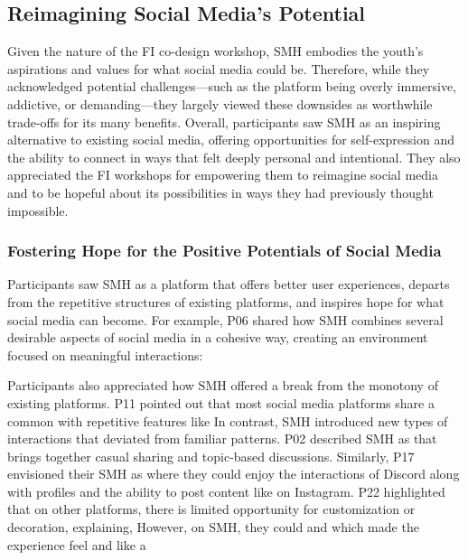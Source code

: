 \subsection{Reimagining Social Media's Potential}
\label{lab:4-6}
Given the nature of the FI co-design workshop, SMH embodies the youth's aspirations and values for what social media could be. Therefore, while they acknowledged potential challenges---such as the platform being overly immersive, addictive, or demanding---they largely viewed these downsides as worthwhile trade-offs for its many benefits. Overall, participants saw SMH as an inspiring alternative to existing social media, offering opportunities for self-expression and the ability to connect in ways that felt deeply personal and intentional. They also appreciated the FI workshops for empowering them to reimagine social media and to be hopeful about its possibilities in ways they had previously thought impossible.

\subsubsection{Fostering Hope for the Positive Potentials of Social Media}
\label{lab:4-6-1}
Participants saw SMH as a platform that offers better user experiences, departs from the repetitive structures of existing platforms, and inspires hope for what social media can become. For example, P06 shared how SMH combines several desirable aspects of social media in a cohesive way, creating an environment focused on meaningful interactions: 

Participants also appreciated how SMH offered a break from the monotony of existing platforms. P11 pointed out that most social media platforms share a common  with repetitive features like  In contrast, SMH introduced new types of interactions that deviated from familiar patterns. P02 described SMH as  that brings together casual sharing and topic-based discussions. Similarly, P17 envisioned their SMH as  where they could enjoy the interactions of Discord along with profiles and the ability to post content like on Instagram. P22 highlighted that on other platforms, there is limited opportunity for customization or decoration, explaining,  However, on SMH, they could  and  which made the experience feel  and  like a 

